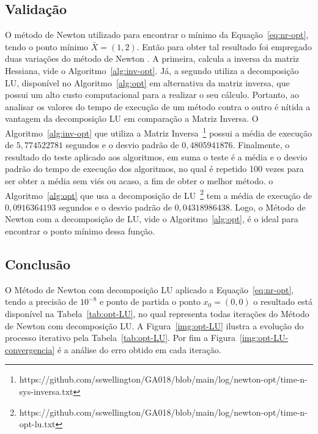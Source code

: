 \subsection{Validação}

O método de Newton utilizado para encontrar o mínimo da Equação~\ref{eq:nr-opt}, tendo o ponto mínimo $\bar{X} = (1,2)$.
Então para obter tal resultado foi empregado duas variações do método de Newton \cite{ruggiero2000calculo,quarteroni2010numerical}.
A primeira, calcula a inversa da matriz Hessiana, vide o Algoritmo~\ref{alg:inv-opt}.
Já, a segundo utiliza a decomposição LU, disponível no Algoritmo~\ref{alg:opt} em alternativa da matriz inversa, que possui um alto custo computacional para a realizar o seu cálculo.
Portanto, ao analisar os valores do tempo de execução de um método contra o outro é nítida a vantagem da decomposição LU em comparação a Matriz Inversa.
O Algoritmo~\ref{alg:inv-opt} que utiliza a Matriz Inversa~\footnote{https://github.com/sswellington/GA018/blob/main/log/newton-opt/time-n-sys-inversa.txt} possui a média  de execução de $5,774522781$ segundos e o desvio padrão de $0,4805941876$.
Finalmente, o resultado do teste aplicado aos algoritmos, em suma o teste é a média e o desvio padrão do tempo de execução dos algoritmos, no qual é repetido 100 vezes para ser obter a média sem viés ou acaso, a fim de obter o melhor método.
o Algoritmo~\ref{alg:opt} que usa a decomposição de LU~\footnote{https://github.com/sswellington/GA018/blob/main/log/newton-opt/time-n-opt-lu.txt} tem a média de execução de $0,0916364193$ segundos e o desvio padrão de $0,04318986438$.
Logo, o Método de Newton com a decomposição de LU, vide o Algoritmo~\ref{alg:opt}, é o ideal para encontrar o ponto mínimo dessa função.


\subsection{Conclusão}
O Método de Newton com decomposição LU aplicado a Equação~\ref{eq:nr-opt}, tendo a precisão de $10^{-8}$ e ponto de partida o ponto $x_{0} = (0,0)$ o resultado está disponível na Tabela~\ref{tab:opt-LU}, no qual representa todas iterações do Método de Newton com decomposição LU. 
A Figura~\ref{img:opt-LU} ilustra a evolução do processo iterativo pela Tabela~\ref{tab:opt-LU}.
Por fim a Figura~\ref{img:opt-LU-convergencia} é a análise do erro
obtido em cada iteração.
 

